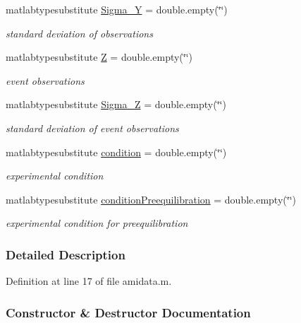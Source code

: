 \begin{DoxyCompactItemize}
matlabtypesubstitute \mbox{\hyperlink{classamidata_a4bd82fb17b03a0039c2f0347ec8dc393}{Sigma\+\_\+Y}} = double.\+empty(\char`\"{}\char`\"{})
\begin{DoxyCompactList}\small\item\em standard deviation of observations \end{DoxyCompactList}\item 
matlabtypesubstitute \mbox{\hyperlink{classamidata_adc18d83abfd9f87d396e8fd6b6ac0fe1}{Z}} = double.\+empty(\char`\"{}\char`\"{})
\begin{DoxyCompactList}\small\item\em event observations \end{DoxyCompactList}\item 
matlabtypesubstitute \mbox{\hyperlink{classamidata_a77b1f0ddcfbfb895b17d62a414d35673}{Sigma\+\_\+Z}} = double.\+empty(\char`\"{}\char`\"{})
\begin{DoxyCompactList}\small\item\em standard deviation of event observations \end{DoxyCompactList}\item 
matlabtypesubstitute \mbox{\hyperlink{classamidata_a4824b91cc0e6b5f112bdd8049af4d7d6}{condition}} = double.\+empty(\char`\"{}\char`\"{})
\begin{DoxyCompactList}\small\item\em experimental condition \end{DoxyCompactList}\item 
matlabtypesubstitute \mbox{\hyperlink{classamidata_af7a0dbd9e6e3f3cb15ae008beeaf841a}{condition\+Preequilibration}} = double.\+empty(\char`\"{}\char`\"{})
\begin{DoxyCompactList}\small\item\em experimental condition for preequilibration \end{DoxyCompactList}\end{DoxyCompactItemize}


\subsubsection{Detailed Description}


Definition at line 17 of file amidata.\+m.



\subsubsection{Constructor \& Destructor Documentation}
\mbox{\label{classamidata_a28c05d6ebaf7baa45ff8b2465ce07b3f}} 
